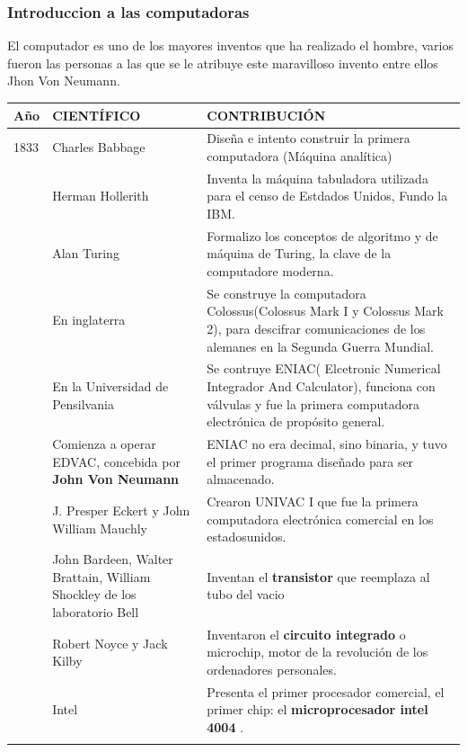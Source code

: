\documentclass[a4paper,12pt,spanish]{article}
\begin{document}
\subsubsection{Introduccion a las computadoras}
\label{sec:intr-las-comp-1}

El computador es uno de los mayores inventos que ha realizado el hombre, varios fueron las personas a las que se le atribuye este maravilloso invento entre ellos Jhon Von Neumann.\\

\begin{longtable}[H]{|l|m{4cm}|m{10cm}|}
  \hline
  \rowcolor{gray!10}
  Año & CIENTÍFICO & CONTRIBUCIÓN \\ \hline \hline
  1833 &Charles Babbage & Diseña e intento construir la primera computadora (Máquina analítica) \\ \hdashline
  1890 &Herman Hollerith & Inventa la máquina tabuladora utilizada para el censo de Estdados Unidos, Fundo la IBM. \\ \hdashline
  1936 &Alan Turing  & Formalizo los conceptos de algoritmo y de máquina de Turing, la clave de la computadore moderna.\\ \hdashline
  1944 & En inglaterra & Se construye la computadora Colossus(Colossus Mark I y Colossus Mark 2), para descifrar comunicaciones de los alemanes en la Segunda Guerra Mundial.\\ \hdashline
  1947 & En la Universidad de Pensilvania & Se contruye ENIAC( Elcetronic Numerical Integrador And Calculator), funciona con válvulas y fue la primera computadora electrónica de propósito general. \\ \hdashline
  1951 & Comienza a operar EDVAC, concebida por \textbf{John Von Neumann} & ENIAC no era decimal, sino binaria, y tuvo el primer programa diseñado para ser almacenado. \\ \hdashline
  1951 & J. Presper Eckert y John William Mauchly & Crearon UNIVAC I que fue la primera computadora electrónica comercial en los estadosunidos.\\ \hdashline
  1947 & John Bardeen, Walter Brattain, William Shockley de los laboratorio Bell & Inventan el \textbf{transistor} que reemplaza al tubo del vacio \\ \hdashline
  1957 &Robert Noyce y Jack Kilby & Inventaron el \textbf{circuito integrado} o microchip, motor de la revolución de los ordenadores personales. \\ \hdashline
  1971 & Intel & Presenta el primer procesador comercial, el primer chip: el \textbf{microprocesador intel 4004} .\\ \hdashline

\end{longtable}
\end{document}

